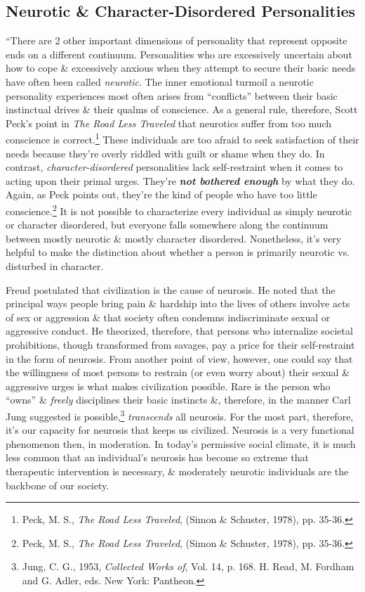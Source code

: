 \documentclass{article}
\numberwithin{equation}{section}
\begin{document}
\subsection{Neurotic \& Character-Disordered Personalities}
``There are 2 other important dimensions of personality that represent opposite ends on a different continuum. Personalities who are excessively uncertain about how to cope \& excessively anxious when they attempt to secure their basic needs have often been called \textit{neurotic}. The inner emotional turmoil a neurotic personality experiences most often arises from ``conflicts'' between their basic instinctual drives \& their qualms of conscience. As a general rule, therefore, Scott Peck's point in \textit{The Road Less Traveled} that neurotics suffer from too much conscience is correct.\footnote{Peck, M. S., \textit{The Road Less Traveled}, (Simon \& Schuster, 1978), pp. 35-36.} These individuals are too afraid to seek satisfaction of their needs because they're overly riddled with guilt or shame when they do. In contrast, \textit{character-disordered} personalities lack self-restraint when it comes to acting upon their primal urges. They're \textbf{\textit{not bothered enough}} by what they do. Again, as Peck points out, they're the kind of people who have too little conscience.\footnote{Peck, M. S., \textit{The Road Less Traveled}, (Simon \& Schuster, 1978), pp. 35-36.} It is not possible to characterize every individual as simply neurotic or character disordered, but everyone falls somewhere along the continuum between mostly neurotic \& mostly character disordered. Nonetheless, it's very helpful to make the distinction about whether a person is primarily neurotic vs. disturbed in character.

Freud postulated that civilization is the cause of neurosis. He noted that the principal ways people bring pain \& hardship into the lives of others involve acts of sex or aggression \& that society often condemns indiscriminate sexual or aggressive conduct. He theorized, therefore, that persons who internalize societal prohibitions, though transformed from savages, pay a price for their self-restraint in the form of neurosis. From another point of view, however, one could say that the willingness of most persons to restrain (or even worry about) their sexual \& aggressive urges is what makes civilization possible. Rare is the person who ``owns'' \& \textit{freely} disciplines their basic instincts \&, therefore, in the manner Carl Jung suggested is possible,\footnote{Jung, C. G., 1953,\textit{ Collected Works of}, Vol. 14, p. 168. H. Read, M. Fordham and G. Adler, eds. New York: Pantheon.} \textit{transcends} all neurosis. For the most part, therefore, it's our capacity for neurosis that keeps us civilized. Neurosis is a very functional phenomenon then, in moderation. In today's permissive social climate, it is much less common that an individual's neurosis has become so extreme that therapeutic intervention is necessary, \& moderately neurotic individuals are the backbone of our society.
\end{document}

